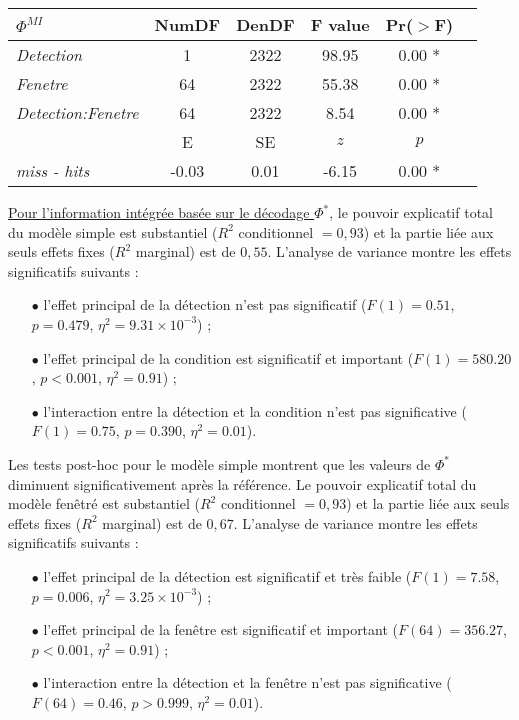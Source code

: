 \begin{table}[!t]
\begin{multicols}{2}
\vspace{0.5cm}

\begin{tabular}{|l|*{5}{c|}}
\hline
\textbf{$\Phi^{MI}$} & \textbf{NumDF} & \textbf{DenDF} & \textbf{F value} & \textbf{Pr($>$F)} \\ 
\hline
\textit{Detection} & 1 & 2322 & 98.95 & 0.00 * \\ 
\textit{Fenetre} & 64 & 2322 & 55.38 & 0.00 * \\ 
\textit{Detection:Fenetre} & 64 & 2322 & 8.54 & 0.00 * \\ 
\hline
& E & SE & $z$ & $p$ \\
\hline
\textit{miss - hits} & -0.03 & 0.01 & -6.15 & 0.00 * \\ 
\hline
\end{tabular}

\end{multicols}
\end{table}

\underline{Pour l'information intégrée basée sur le décodage $\Phi^{*}$}, le pouvoir explicatif total du modèle simple est substantiel ($R^2$ conditionnel $=0,93$) et la partie liée aux seuls effets fixes ($R^2$ marginal) est de $0,55$. 
L'analyse de variance montre les effets significatifs suivants :
\begin{itemize}
\item[$\bullet$] l'effet principal de la détection n'est pas significatif ($F(1)=0.51$, $p=0.479$, $\eta^2=9.31\times10^{-3}$) ; 
\item[$\bullet$] l'effet principal de la condition est significatif et important ($F(1)=580.20$, $p<0.001$, $\eta^2=0.91$) ; 
\item[$\bullet$] l'interaction entre la détection et la condition n'est pas significative ($F(1)=0.75$, $p=0.390$, $\eta^2=0.01$).
\end{itemize}
Les tests post-hoc pour le modèle simple montrent que les valeurs de $\Phi^{*}$ diminuent significativement après la référence.
Le pouvoir explicatif total du modèle fenêtré est substantiel ($R^2$ conditionnel $=0,93$) et la partie liée aux seuls effets fixes ($R^2$ marginal) est de $0,67$. 
L'analyse de variance montre les effets significatifs suivants : 
\begin{itemize}
\item[$\bullet$] l'effet principal de la détection est significatif et très faible ($F(1)=7.58$, $p=0.006$, $\eta^2=3.25\times10^{-3}$) ; 
\item[$\bullet$] l'effet principal de la fenêtre est significatif et important ($F(64)=356.27$, $p<0.001$, $\eta^2=0.91$) ; 
\item[$\bullet$] l'interaction entre la détection et la fenêtre n'est pas significative ($F(64)=0.46$, $p>0.999$, $\eta^2=0.01$). \\
\end{itemize}

